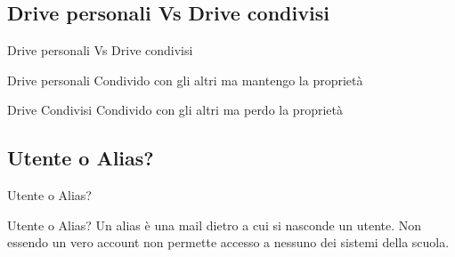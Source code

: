 \subsection{Drive personali Vs Drive condivisi}
\begin{frame}{Drive personali Vs Drive condivisi}
	\begin{alertblock}{Drive personali}
		Condivido con gli altri ma mantengo la proprietà
	\end{alertblock}
	\begin{block}{Drive Condivisi}
		Condivido con gli altri ma perdo la proprietà
	\end{block}
\end{frame}
\subsection{Utente o Alias?}
\begin{frame}{Utente o Alias?}
	\begin{alertblock}{Utente o Alias?}
		Un alias è una mail dietro a cui si nasconde un utente. Non essendo un vero account non permette accesso a nessuno dei sistemi della scuola. 
	\end{alertblock}
\end{frame}